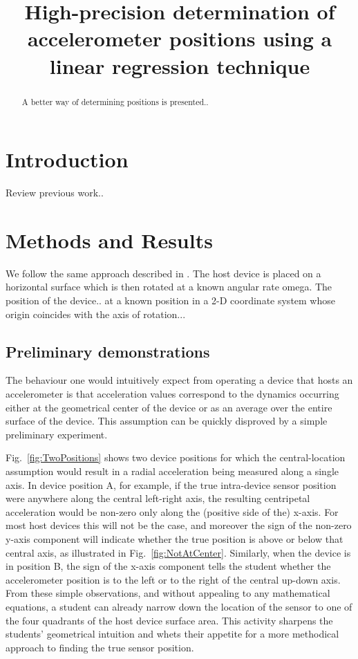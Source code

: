 \documentclass[prb,preprint]{revtex4-1}
\begin{document}
\title{High-precision determination of accelerometer positions using a linear regression technique}



\begin{abstract}
A better way of determining positions is presented..
\end{abstract}

\maketitle
\section{Introduction}

Review previous work..

\section{Methods and Results}
We follow the same approach described in \cite{LarnderLarade}. The host device is placed on a horizontal surface which is then rotated at a known angular rate omega. The position of the device.. at a known position in a 2-D coordinate system whose origin coincides with the axis of rotation...

\subsection{Preliminary demonstrations}
The behaviour one would intuitively expect from operating a device that hosts an accelerometer is that acceleration values correspond to the dynamics occurring either at the geometrical center of the device or as an average over the entire surface of the device. This assumption can be quickly disproved by a simple preliminary experiment.
 
Fig.~\ref{fig:TwoPositions} shows two device positions for which the central-location assumption would result in a radial acceleration being measured along a single axis. In device position A, for example, if the true intra-device sensor position were anywhere along the central left-right axis, the resulting centripetal acceleration would be non-zero only along the (positive side of the) x-axis. For most host devices this will not be the case, and moreover the sign of the non-zero y-axis component will indicate whether the true position is above or below that central axis, as illustrated in Fig.~\ref{fig:NotAtCenter}. Similarly, when the device is in position B, the sign of the x-axis component tells the student whether the accelerometer position is to the left or to the right of the central up-down axis. From these simple observations, and without appealing to any mathematical equations, a student can already narrow down the location of the sensor to one of the four quadrants of the host device surface area. This activity sharpens the students' geometrical intuition and whets their appetite for a more methodical approach to finding the true sensor position.
\end{document}
